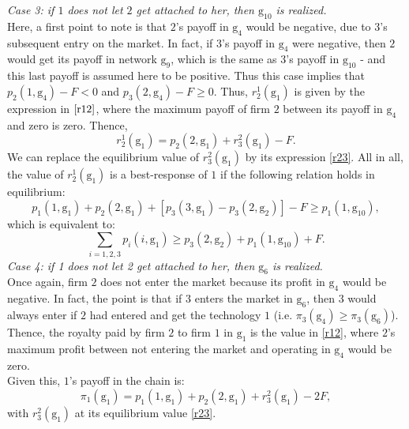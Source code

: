 \documentclass{article}
\begin{document}
\textit{Case 3: if $1$ does not let $2$ get attached to her, then $\text{g}_{10}$ is realized.}\\
Here, a first point to note is that $2$'s payoff in $\text{g}_4$ would be negative, due to $3$'s subsequent entry on the market. In fact, if $3$'s payoff in $\text{g}_4$ were negative, then $2$ would get its payoff in network $\text{g}_9$, which is the same as $3$'s payoff in $\text{g}_{10}$ - and this last payoff is assumed here to be positive. Thus this case implies that $p_2(1,\text{g}_4)-F< 0$ and $p_3(2,\text{g}_4)-F\geq 0$. Thus, $r^1_2(\text{g}_1)$ is given by the expression in $\eqref{r12}$, where the maximum payoff of firm $2$ between its payoff in $\text{g}_4$ and zero is zero. Thence,  
\begin{equation*}
    r^1_2(\text{g}_1)=p_2(2,\text{g}_1)+r^2_3(\text{g}_1)-F. 
\end{equation*}
We can replace the equilibrium value of $r^2_3(\text{g}_1)$ by its expression \eqref{r23}. All in all, the value of $r^1_2(\text{g}_1)$ is a best-response of $1$ if the following relation holds in equilibrium: 
\begin{equation*}
    p_1(1,\text{g}_1)+p_2(2,\text{g}_1)+[ p_3(3,\text{g}_1)-p_3(2,\text{g}_2)]-F  \geq p_1(1,\text{g}_{10}),
\end{equation*}
which is equivalent to: 
\begin{equation}
    \sum_{i=1,2,3}p_i(i,\text{g}_1)\geq p_3(2,\text{g}_2)+p_1(1,\text{g}_{10})+F.
\end{equation}
\textit{Case 4: if 1 does not let 2 get attached to her, then $\text{g}_6$ is realized.}\\
Once again, firm $2$ does not enter the market because its profit in $\text{g}_4$ would be negative. In fact, the point is that if $3$ enters the market in $\text{g}_6$, then $3$ would always enter if $2$ had entered and get the technology $1$ (i.e. $\pi_3(\text{g}_4)\geq \pi_3(\text{g}_6)$). Thence, the royalty paid by firm $2$ to firm $1$ in $\text{g}_1$ is the value in \eqref{r12}, where $2$'s maximum profit between not entering the market and operating in $\text{g}_4$ would be zero.\\
Given this, $1$'s payoff in the chain is: 
\begin{equation*}
    \pi_1(\text{g}_1)=p_1(1,\text{g}_1)+p_2(2,\text{g}_1)+r^2_3(\text{g}_1)-2F,
\end{equation*}
with $r^2_3(\text{g}_1)$ at its equilibrium value \eqref{r23}. \\
\end{document}
